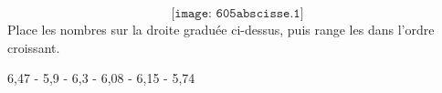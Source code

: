 \[\texttt{[image: 605abscisse.1]}\]
Place les nombres sur la droite graduée ci-dessus, puis range les dans l'ordre croissant.
\begin{center}
  6,47 - 5,9 - 6,3 - 6,08 - 6,15 - 5,74
\end{center}
